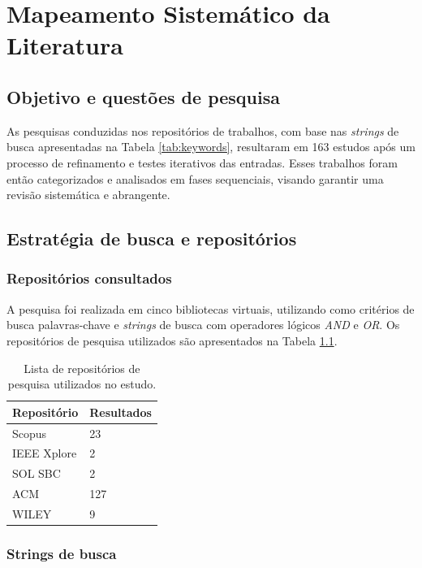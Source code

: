 \chapter{Mapeamento Sistemático da Literatura}\label{chap:msl}

\section{Objetivo e questões de pesquisa}\label{sec:msl-objetivo}

As pesquisas conduzidas nos repositórios de trabalhos, com base nas \textit{strings} de busca apresentadas na Tabela \ref{tab:keywords}, resultaram em 163 estudos após um processo de refinamento e testes iterativos das entradas. Esses trabalhos foram então categorizados e analisados em fases sequenciais, visando garantir uma revisão sistemática e abrangente.

\section{Estratégia de busca e repositórios}\label{sec:msl-estrategia}

\subsection{Repositórios consultados}\label{subsec:repositorios}

A pesquisa foi realizada em cinco bibliotecas virtuais, utilizando como critérios de busca palavras-chave e \textit{strings} de busca com operadores lógicos \textit{AND} e \textit{OR}. Os repositórios de pesquisa utilizados são apresentados na Tabela \ref{tab:repositorios}.

\begin{table}[H]
\centering
\small
\begin{tabular}{|m{3cm}|m{5cm}|}
\hline 
\textbf{Repositório} & \textbf{Resultados} \\ 
\hline 
Scopus & 23 \\ 
\hline 
IEEE Xplore & 2 \\ 
\hline 
SOL SBC & 2 \\ 
\hline 
ACM & 127 \\ 
\hline
WILEY & 9 \\ 
\hline
\end{tabular}
\caption{Lista de repositórios de pesquisa utilizados no estudo.}
\label{tab:repositorios}
\end{table}

\subsection{Strings de busca}\label{subsec:strings-busca}

